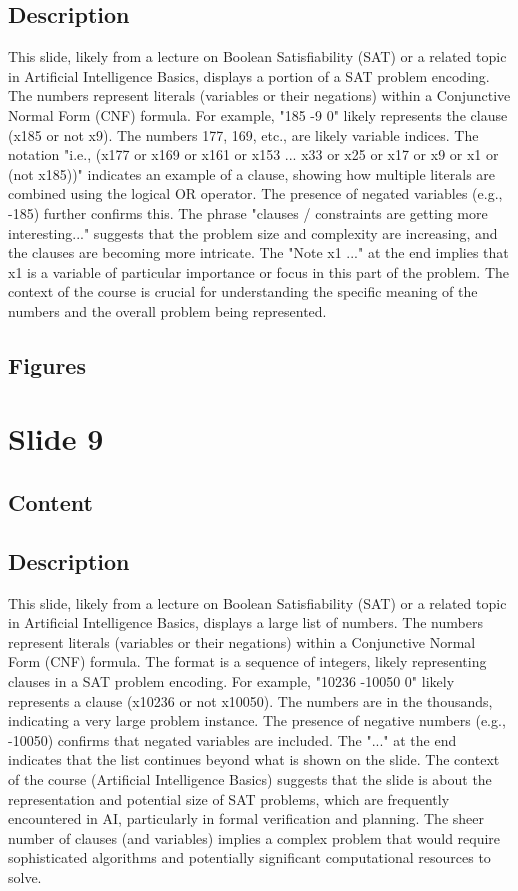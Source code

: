 \documentclass{article}%
\begin{document}
\subsection{Description}%
This slide, likely from a lecture on Boolean Satisfiability (SAT) or a related topic in Artificial Intelligence Basics, displays a portion of a SAT problem encoding.  The numbers represent literals (variables or their negations) within a Conjunctive Normal Form (CNF) formula.  For example, "185 -9 0" likely represents the clause (x185 or not x9).  The numbers 177, 169, etc., are likely variable indices.  The notation "i.e., (x177 or x169 or x161 or x153 ... x33 or x25 or x17 or x9 or x1 or (not x185))" indicates an example of a clause, showing how multiple literals are combined using the logical OR operator.  The presence of negated variables (e.g., -185) further confirms this.  The phrase "clauses / constraints are getting more interesting..." suggests that the problem size and complexity are increasing, and the clauses are becoming more intricate.  The "Note x1 ..." at the end implies that x1 is a variable of particular importance or focus in this part of the problem.  The context of the course is crucial for understanding the specific meaning of the numbers and the overall problem being represented.%
\subsection{Figures}%
\begin{figure}[H]%
\centering%
\end{figure}

%
\newpage%
\section{Slide 9}%
\label{sec:Slide9}%
\subsection{Content}%
%
\subsection{Description}%
This slide, likely from a lecture on Boolean Satisfiability (SAT) or a related topic in Artificial Intelligence Basics, displays a large list of numbers.  The numbers represent literals (variables or their negations) within a Conjunctive Normal Form (CNF) formula.  The format is a sequence of integers, likely representing clauses in a SAT problem encoding.  For example, "10236 -10050 0" likely represents a clause (x10236 or not x10050).  The numbers are in the thousands, indicating a very large problem instance.  The presence of negative numbers (e.g., -10050) confirms that negated variables are included.  The "..." at the end indicates that the list continues beyond what is shown on the slide.  The context of the course (Artificial Intelligence Basics) suggests that the slide is about the representation and potential size of SAT problems, which are frequently encountered in AI, particularly in formal verification and planning. The sheer number of clauses (and variables) implies a complex problem that would require sophisticated algorithms and potentially significant computational resources to solve.%
\end{document}
